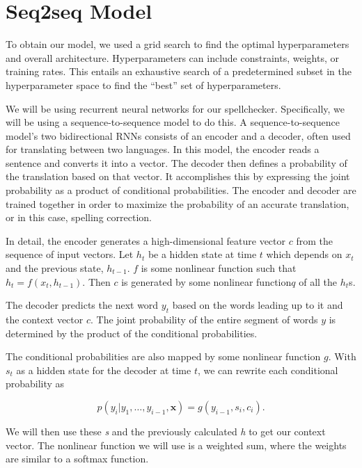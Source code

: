 \documentclass[11pt,a4paper]{scrartcl}
\theoremstyle{definition}
\begin{document}
\section{Seq2seq Model}

To obtain our model, we used a grid search to find the optimal hyperparameters and overall architecture. Hyperparameters can include constraints, weights, or training rates. This entails an exhaustive search of a predetermined subset in the hyperparameter space to find the “best” set of hyperparameters.\newline

We will be using recurrent neural networks for our spellchecker. Specifically, we will be using a sequence-to-sequence model to do this. A sequence-to-sequence model’s two bidirectional RNNs consists of an encoder and a decoder, often used for translating between two languages. 
In this model, the encoder reads a sentence and converts it into a vector. The decoder then defines a probability of the translation based on that vector. It accomplishes this by expressing the joint probability as a product of conditional probabilities. The encoder and decoder are trained together in order to maximize the probability of an accurate translation, or in this case, spelling correction.\newline

In detail, the encoder generates a high-dimensional feature vector $c$ from the sequence of input vectors. Let $h_t$ be a hidden state at time $t$ which depends on $x_t$ and the previous state, $h_{t-1}$. $f$ is some nonlinear function such that $h_t = f(x_t, h_{t-1})$. Then $c$ is generated by some nonlinear function$q$ of all the $h_t$s. \newline

The decoder predicts the next word $y_t$ based on the words leading up to it and the context vector $c$. The joint probability of the entire segment of words $y$ is determined by the product of the conditional probabilities. \newline

The conditional probabilities are also mapped by some nonlinear function $g$. With $s_t$ as a hidden state for the decoder at time $t$, we can rewrite each conditional probability as

\[p(y_i | y_1,\dots,y_{i-1}, \textbf{x}) = g(y_{i-1},s_i,c_i).\]

We will then use these \textit{s} and the previously calculated \textit{h} to get our context vector. The nonlinear function we will use is a weighted sum, where the weights are similar to a softmax function. \newline
\end{document}
